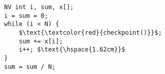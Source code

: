 \documentclass[border={25pt 0pt 15pt 5pt}]{standalone} %
\begin{document}
	

\begin{lstlisting}[style=mystyle, linewidth=87px]
NV int i, sum, x[];
i = sum = 0;
while (i < N) {
    $\text{\textcolor{red}{checkpoint()}}$;
    sum += x[i];
    i++; $\text{\hspace{1.62cm}}$
}
sum = sum / N;
\end{lstlisting} 
\end{document}
